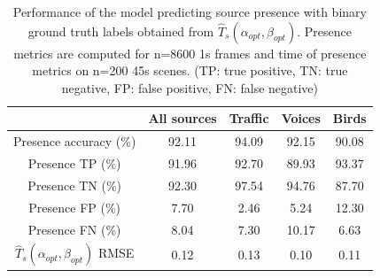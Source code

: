 \documentclass[twocolumn]{article}
\begin{document}
\begin{table}[t]
\centering
\caption{Performance of the model predicting source presence with binary ground truth labels obtained from $\hat T_s(\alpha_{opt}, \beta_{opt})$. Presence metrics are computed for n=8600 1s frames and time of presence metrics on n=200 45s scenes. (TP: true positive, TN: true negative, FP: false positive, FN: false negative)}
\label{tab:perf_cmp}
\begin{tabular}{ c | c | c c c }
\hline
	 & All sources & Traffic & Voices & Birds \\ \hline
	Presence accuracy (\%) &  92.11 & 94.09 & 92.15 & 90.08 \\
	Presence TP (\%) & 91.96 & 92.70 & 89.93 & 93.37 \\
	Presence TN (\%) & 92.30 & 97.54 & 94.76 & 87.70 \\
	Presence FP (\%) & 7.70 & 2.46 & 5.24 & 12.30 \\
	Presence FN (\%) & 8.04 & 7.30 & 10.17 & 6.63 \\ \hline
	$\hat T_s(\alpha_{opt}, \beta_{opt})$ RMSE & 0.12 & 0.13 & 0.10 & 0.11 \\
\end{tabular}
\end{table}
\end{document}
